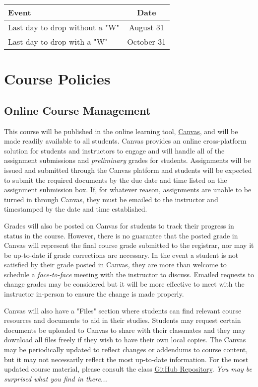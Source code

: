 \begin{table*}[h!]
    \begin{tabular}{ l | c }
        \toprule
        Event & Date \\

        \midrule
        Last day to drop without a "W"  & August 31 \\
        Last day to drop with a "W"     & October 31 \\

        \bottomrule
    \end{tabular}
\end{table*}

\section*{Course Policies} 
    \subsection*{Online Course Management}
    This course will be published in the online learning tool, \href{instructure.fit.edu}{Canvas}, and will be made readily available to all students. 
    Canvas provides an online cross-platform solution for students and instructors to engage and will handle all of the assignment submissions and \emph{preliminary} grades for students.
    Assignments will be issued and submitted through the Canvas platform and students will be expected to submit the required documents by the due date and time listed on the assignment submission box.
    If, for whatever reason, assignments are unable to be turned in through Canvas, they must be emailed to the instructor and timestamped by the date and time established.
    
    Grades will also be posted on Canvas for students to track their progress in status in the course.
    However, there is no guarantee that the posted grade in Canvas will represent the final course grade submitted to the registrar, nor may it be up-to-date if grade corrections are necessary.
    In the event a student is not satisfied by their grade posted in Canvas, they are more than welcome to schedule a \emph{face-to-face} meeting with the instructor to discuss.
    Emailed requests to change grades may be considered but it will be more effective to meet with the instructor in-person to ensure the change is made properly.

    Canvas will also have a "Files" section where students can find relevant course resources and documents to aid in their studies.
    Students may request certain documents be uploaded to Canvas to share with their classmates and they may download all files freely if they wish to have their own local copies.
    The Canvas may be periodically updated to reflect changes or addendums to course content, but it may not necessarily reflect the most up-to-date information.
    For the most updated course material, please consult the class \href{https://github.com/OCE4531-Materials}{GitHub Repository}. \emph{You may be surprised what you find in there...}

